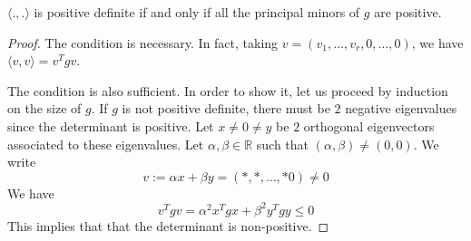 \begin{lemma} [Sylvester]
$\langle ., . \rangle$ is positive definite if and only if all the principal minors of $g$ are positive.
\end{lemma}
\begin{proof}
The condition is necessary. In fact, taking $v = (v_1, \ldots , v_r , 0, \ldots , 0)$, we have $\langle v, v \rangle = v^T g v$.

The condition is also sufficient. In order to show it, let us proceed by induction on the size of $g$. If $g$ is not positive definite, there must be $2$ negative eigenvalues since the determinant is positive. Let $x \neq 0 \neq y$ be $2$ orthogonal eigenvectors associated to these eigenvalues. Let $\alpha, \beta \in \mathbb{R}$ such that $(\alpha, \beta) \neq (0, 0)$. We write
\begin{equation}
v := \alpha x + \beta y = (*, *, \ldots , * 0 ) \neq 0
\end{equation}   We have
\begin{equation}
v^T g v = \alpha^2 x^T g x + \beta^2 y^T g y \le 0
\end{equation} This implies that that the determinant is non-positive.
\end{proof}

